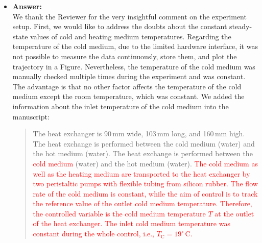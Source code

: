 \documentclass[a4paper,10pt]{article}
\newcommand{\change}[1]{\textcolor{red}{#1}}
\newcommand{\answer}[1]{
	\begin{itemize}
		\item[] \textbf{Answer:}\\ #1
	\end{itemize}
}
\begin{document}
	\answer{
		We thank the Reviewer for the very insightful comment on the experiment setup. 
		First, we would like to address the doubts about the constant steady-state values of cold and heating medium temperatures. Regarding the temperature of the cold medium, due to the limited hardware interface, it was not possible to measure the data continuously, store them, and plot the trajectory in a Figure. Nevertheless, the temperature of the cold medium was manually checked multiple times during the experiment and was constant. The advantage is that no other factor affects the temperature of the cold medium except the room temperature, which was constant. We added the information about the inlet temperature of the cold medium into the manuscript:
		
		\begin{quote}
			The heat exchanger is 90\,mm wide, 103\,mm long, and 160\,mm high. The heat exchange is performed between the cold medium (water) and the hot medium (water). The heat exchange is performed between the \change{cold medium} (water) and the hot medium (water). \change{The cold medium as well as the heating medium are transported to the heat exchanger by two peristaltic pumps with flexible tubing from silicon rubber. The flow rate of the cold medium is constant, while the aim of control is to track the reference value of the outlet cold medium temperature. Therefore, the controlled variable is the \change{cold medium} temperature $T$ at the outlet of the heat exchanger. The inlet cold medium temperature was constant during the whole control, i.e., $T_\mathrm{C} = 19^{\circ}$\,C.} 
		\end{quote}

}
\end{document}
